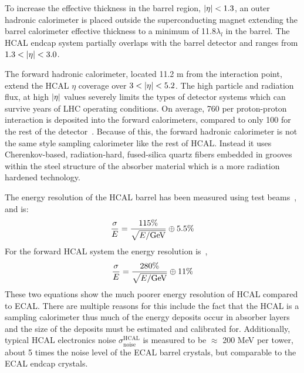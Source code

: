 To increase the effective
thickness in the barrel region, $\lvert\eta\rvert < 1.3$, an outer hadronic calorimeter is placed 
outside the superconducting magnet extending the barrel calorimeter
effective thickness to a minimum of 11.8$\lambda_{l}$ in the barrel. 
The HCAL endcap system partially overlaps with the barrel detector and ranges from
$1.3 < \lvert\eta\rvert < 3.0$.

The forward hadronic calorimeter, located
11.2 m from the interaction point, extend the HCAL $\eta$ coverage over $3 < \lvert\eta\rvert < 5.2$.
The high particle and radiation flux, at high $\lvert\eta\rvert$ values
severely limits the types of detector systems which can survive years of LHC operating
conditions. On average, 760 \GeV per proton-proton interaction is deposited into the forward 
calorimeters, compared to only 100 \GeV for the rest of the detector~\cite{Chatrchyan:2008zzk}.
Because of this, the forward hadronic calorimeter is not the same style sampling
calorimeter like the rest of HCAL. Instead it uses Cherenkov-based, 
radiation-hard, fused-silica quartz fibers embedded in grooves within the steel structure
of the absorber material which is a more radiation hardened technology.

The energy resolution of the HCAL barrel has been measured using test beams~\cite{Elvira:800406}, and is:
\begin{equation}
\label{eqn:hcal_res}
\frac{\sigma}{E} = \frac{115\%}{\sqrt{E/\mathrm{GeV}}} \oplus 5.5\%
\end{equation}
For the forward HCAL system the energy resolution is~\cite{Baiatian:951395},
\begin{equation}
\label{eqn:hcal_res}
\frac{\sigma}{E} = \frac{280\%}{\sqrt{E/\mathrm{GeV}}} \oplus 11\%
\end{equation}
These two equations show the much poorer energy resolution of HCAL compared to ECAL.
There are multiple reasons for this include the fact that the HCAL is a sampling 
calorimeter thus much of the energy deposits occur in absorber layers and the 
size of the deposits must be estimated and calibrated for.
Additionally, typical HCAL electronics noise $\sigma ^{\text{HCAL}} _{\text{noise}}$ 
is measured to be $\approx$ 200 MeV per tower, about 5 times the noise level of
the ECAL barrel crystals, but comparable to the ECAL endcap crystals.

